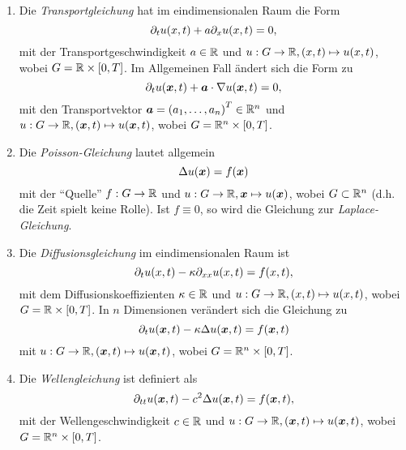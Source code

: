 \documentclass{lecture}
\begin{document}
    \begin{example}
        \begin{enumerate}
            \item Die \emph{Transportgleichung} hat im eindimensionalen Raum die Form
            \[
                \partial_t u\parentheses*{x, t} + a\partial_x u\parentheses*{x, t} = 0,
            \]
            mit der Transportgeschwindigkeit \(a \in \R\) und \(u: G \to \R, \parentheses*{x, t} \mapsto u\parentheses*{x, t}\), wobei \(G = \R \times \brackets*{0, T}\).
            Im Allgemeinen Fall ändert sich die Form zu
            \[
                \partial_t u\parentheses*{\bm{x}, t} + \bm{a} \cdot \nabla u\parentheses*{\bm{x}, t} = 0,
            \]
            mit den Transportvektor \(\bm{a} = \parentheses*{a_1, \ldots, a_n}^T \in \R^n\) und \(u: G \to \R, \parentheses*{\bm{x}, t} \mapsto u\parentheses*{\bm{x}, t}\), wobei \(G = \R^n \times \brackets*{0, T}\).
            \item Die \emph{Poisson-Gleichung} lautet allgemein
            \[
                \Delta u\parentheses*{\bm{x}} = f\parentheses*{\bm{x}}
            \]
            mit der ``Quelle'' \(f: G \to \R\) und \(u: G \to \R, \bm{x} \mapsto u\parentheses*{\bm{x}}\), wobei \(G \subset \R^n\) (d.h. die Zeit spielt keine Rolle).
            Ist \(f \equiv 0\), so wird die Gleichung zur \emph{Laplace-Gleichung}.
            \item Die \emph{Diffusionsgleichung} im eindimensionalen Raum ist
            \[
                \partial_t u\parentheses*{x, t} - \kappa\partial_{xx}u\parentheses*{x, t} = f\parentheses*{x, t},
            \]
            mit dem Diffusionskoeffizienten \(\kappa \in \R\) und \(u: G \to \R, \parentheses*{x, t} \mapsto u\parentheses*{x, t}\), wobei \(G = \R \times \brackets*{0, T}\).
            In \(n\) Dimensionen verändert sich die Gleichung zu
            \[
                \partial_t u\parentheses*{\bm{x}, t} - \kappa\Delta u\parentheses*{\bm{x}, t} = f\parentheses*{\bm{x}, t}
            \]
            mit \(u: G \to \R, \parentheses*{\bm{x}, t} \mapsto u\parentheses*{\bm{x}, t}\), wobei \(G = \R^n \times \brackets*{0, T}\).
            \item Die \emph{Wellengleichung} ist definiert als
            \[\partial_{tt}u\parentheses*{\bm{x}, t} - c^2 \Delta u\parentheses*{\bm{x}, t} = f\parentheses*{\bm{x}, t},\]
            mit der Wellengeschwindigkeit \(c \in \R\) und \(u: G \to \R, \parentheses*{\bm{x}, t} \mapsto u\parentheses*{\bm{x}, t}\), wobei \(G = \R^n \times \brackets*{0, T}\).

\end{enumerate}
\end{example}
\end{document}
